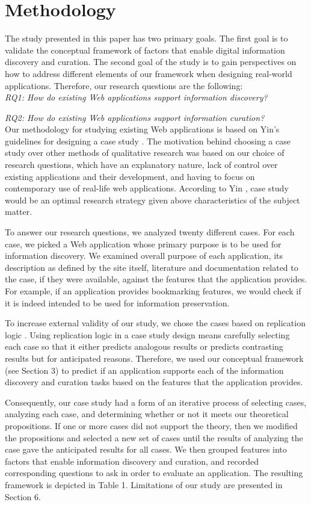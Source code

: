 \documentclass{casconpaper}
\begin{document}
{\section{Methodology}
The study presented in this paper has two primary goals. The first goal is to validate the conceptual framework of factors that enable digital information discovery and curation. The second goal of the study is to gain perspectives on how to address different elements of our framework when designing real-world applications. Therefore, our research questions are the following:
\\

\emph{RQ1: How do existing Web applications support information discovery?}

\emph{RQ2: How do existing Web applications support information curation?}\\


Our methodology for studying existing Web applications is based on Yin’s guidelines for designing a case study \cite{yin}. The motivation behind choosing a case study over other methods of qualitative research was based on our choice of research questions, which have an explanatory nature, lack of control over existing applications and their development, and having to focus on contemporary use of real-life web applications. According to Yin \cite{yin}, case study would be an optimal research strategy given above characteristics of the subject matter.

To answer our research questions, we analyzed twenty different cases. For each case, we picked a Web application whose primary purpose is to be used for information discovery. We examined overall purpose of each application, its description as defined by the site itself, literature and documentation related to the case, if they were available, against the features that the application provides. For example, if an application provides bookmarking features, we would check if it is indeed intended to be used for information preservation.

To increase external validity of our study, we chose the cases based on replication logic \cite{yin}. Using replication logic in a case study design means carefully selecting each case so that it either predicts analogous results or predicts contrasting results but for anticipated reasons. Therefore, we used our conceptual framework (see Section 3) to predict if an application supports each of the information discovery and curation tasks based on the features that the application provides. 

Consequently, our case study had a form of an iterative process of selecting cases, analyzing each case, and determining whether or not it meets our theoretical propositions. If one or more cases did not support the theory, then we modified the propositions and selected a new set of cases until the results of analyzing the case gave the anticipated results for all cases. We then grouped features into factors that enable information discovery and curation, and recorded corresponding questions to ask in order to evaluate an application. The resulting framework is depicted in Table 1. Limitations of our study are presented in Section 6.
} %
\end{document}
